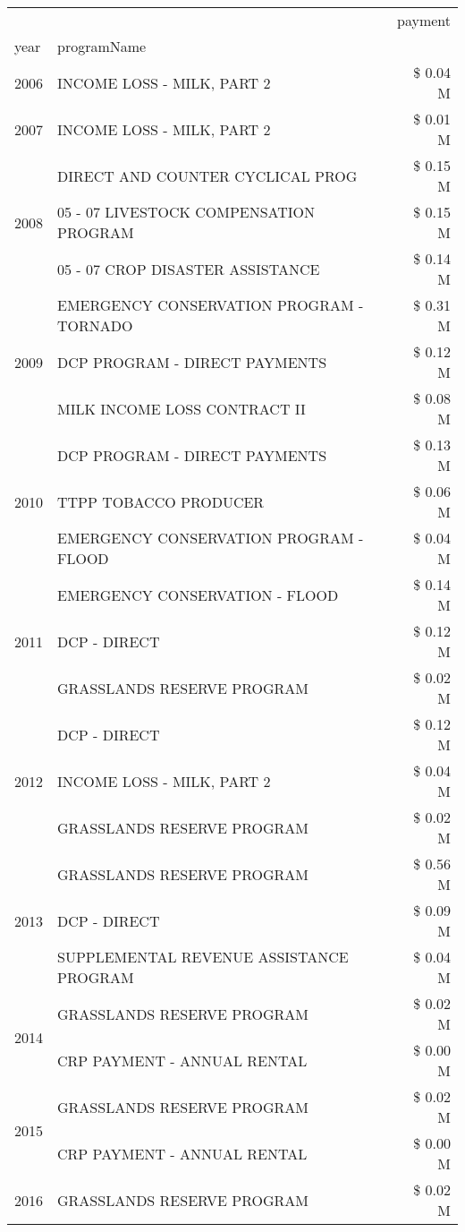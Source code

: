 \begin{tabular}{llr}
\toprule
 &  & payment \\
year & programName &  \\
\midrule
2006 & INCOME LOSS - MILK, PART 2 & \$ 0.04 M \\
\cline{1-3}
2007 & INCOME LOSS - MILK, PART 2 & \$ 0.01 M \\
\cline{1-3}
\multirow[t]{3}{*}{2008} & DIRECT AND COUNTER CYCLICAL PROG & \$ 0.15 M \\
 & 05 - 07 LIVESTOCK COMPENSATION PROGRAM & \$ 0.15 M \\
 & 05 - 07 CROP DISASTER ASSISTANCE & \$ 0.14 M \\
\cline{1-3}
\multirow[t]{3}{*}{2009} & EMERGENCY CONSERVATION PROGRAM - TORNADO & \$ 0.31 M \\
 & DCP PROGRAM - DIRECT PAYMENTS & \$ 0.12 M \\
 & MILK INCOME LOSS CONTRACT II & \$ 0.08 M \\
\cline{1-3}
\multirow[t]{3}{*}{2010} & DCP PROGRAM - DIRECT PAYMENTS & \$ 0.13 M \\
 & TTPP TOBACCO PRODUCER & \$ 0.06 M \\
 & EMERGENCY CONSERVATION PROGRAM - FLOOD & \$ 0.04 M \\
\cline{1-3}
\multirow[t]{3}{*}{2011} & EMERGENCY CONSERVATION - FLOOD & \$ 0.14 M \\
 & DCP - DIRECT & \$ 0.12 M \\
 & GRASSLANDS RESERVE PROGRAM & \$ 0.02 M \\
\cline{1-3}
\multirow[t]{3}{*}{2012} & DCP - DIRECT & \$ 0.12 M \\
 & INCOME LOSS - MILK, PART 2 & \$ 0.04 M \\
 & GRASSLANDS RESERVE PROGRAM & \$ 0.02 M \\
\cline{1-3}
\multirow[t]{3}{*}{2013} & GRASSLANDS RESERVE PROGRAM & \$ 0.56 M \\
 & DCP - DIRECT & \$ 0.09 M \\
 & SUPPLEMENTAL REVENUE ASSISTANCE PROGRAM & \$ 0.04 M \\
\cline{1-3}
\multirow[t]{2}{*}{2014} & GRASSLANDS RESERVE PROGRAM & \$ 0.02 M \\
 & CRP PAYMENT - ANNUAL RENTAL & \$ 0.00 M \\
\cline{1-3}
\multirow[t]{2}{*}{2015} & GRASSLANDS RESERVE PROGRAM & \$ 0.02 M \\
 & CRP PAYMENT - ANNUAL RENTAL & \$ 0.00 M \\
\cline{1-3}
\multirow[t]{3}{*}{2016} & GRASSLANDS RESERVE PROGRAM & \$ 0.02 M \\

\end{tabular}
